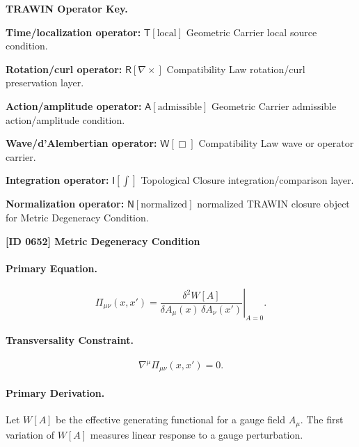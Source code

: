 \par\vspace{0.45\baselineskip}
\noindent\begin{minipage}[t]{\linewidth}
\begingroup
\small
\raggedright
\textbf{TRAWIN Operator Key.}\par
\noindent\textbf{Time/localization operator:} $\mathsf{T}\!\left[\mathrm{local}\right]$ Geometric Carrier local source condition.\par
\noindent\textbf{Rotation/curl operator:} $\mathsf{R}\!\left[\nabla\times\right]$ Compatibility Law rotation/curl preservation layer.\par
\noindent\textbf{Action/amplitude operator:} $\mathsf{A}\!\left[\mathrm{admissible}\right]$ Geometric Carrier admissible action/amplitude condition.\par
\noindent\textbf{Wave/d'Alembertian operator:} $\mathsf{W}\!\left[\Box\right]$ Compatibility Law wave or operator carrier.\par
\noindent\textbf{Integration operator:} $\mathsf{I}\!\left[\int\right]$ Topological Closure integration/comparison layer.\par
\noindent\textbf{Normalization operator:} $\mathsf{N}\!\left[\mathrm{normalized}\right]$ normalized TRAWIN closure object for Metric Degeneracy Condition.\par
\endgroup
\end{minipage}

\clearpage
\noindent\textbf{[ID 0652] Metric Degeneracy Condition}\par
\vspace{0.35em}
\paragraph{Primary Equation.}
\begin{equation}
\Pi_{\mu\nu}(x,x')
=
\left.
\frac{\delta^2 W[A]}
{\delta A_\mu(x)\,\delta A_\nu(x')}
\right|_{A=0}.
\end{equation}

\paragraph{Transversality Constraint.}
\begin{equation}
\nabla^\mu \Pi_{\mu\nu}(x,x')=0 .
\end{equation}

\paragraph{Primary Derivation.}
Let $W[A]$ be the effective generating functional for a gauge field $A_\mu$.  
The first variation of $W[A]$ measures linear response to a gauge perturbation.


